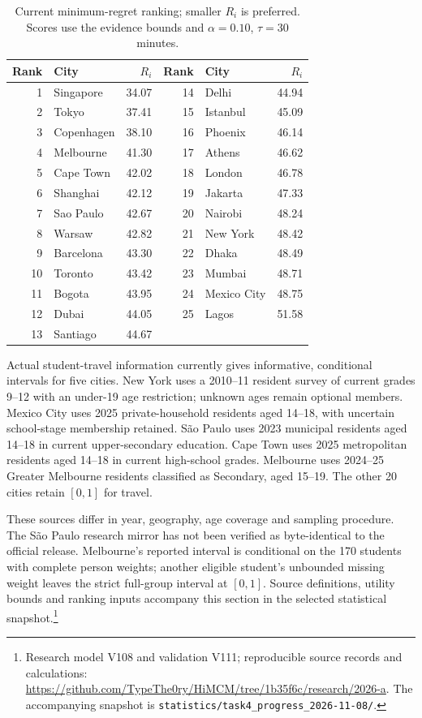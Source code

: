 \begin{table}[htbp]
\centering
\caption{Current minimum-regret ranking; smaller $R_i$ is preferred.
Scores use the evidence bounds and $\alpha=0.10$, $\tau=30$ minutes.}
\label{tab:t4rank}
\begin{tabular}{rlr@{\hspace{1.2em}}rlr}
\toprule
Rank & City & $R_i$ & Rank & City & $R_i$\\
\midrule
1 & Singapore & 34.07 & 14 & Delhi & 44.94 \\
2 & Tokyo & 37.41 & 15 & Istanbul & 45.09 \\
3 & Copenhagen & 38.10 & 16 & Phoenix & 46.14 \\
4 & Melbourne & 41.30 & 17 & Athens & 46.62 \\
5 & Cape Town & 42.02 & 18 & London & 46.78 \\
6 & Shanghai & 42.12 & 19 & Jakarta & 47.33 \\
7 & Sao Paulo & 42.67 & 20 & Nairobi & 48.24 \\
8 & Warsaw & 42.82 & 21 & New York & 48.42 \\
9 & Barcelona & 43.30 & 22 & Dhaka & 48.49 \\
10 & Toronto & 43.42 & 23 & Mumbai & 48.71 \\
11 & Bogota & 43.95 & 24 & Mexico City & 48.75 \\
12 & Dubai & 44.05 & 25 & Lagos & 51.58 \\
13 & Santiago & 44.67 &  & &  \\
\bottomrule
\end{tabular}
\end{table}

Actual student-travel information currently gives informative, conditional
intervals for five cities. New York uses a 2010--11 resident survey of
current grades 9--12 with an under-19 age restriction; unknown ages remain optional members. Mexico City uses
2025 private-household residents aged 14--18, with uncertain school-stage
membership retained. S\~ao Paulo uses 2023 municipal residents aged 14--18
in current upper-secondary education. Cape Town uses 2025 metropolitan
residents aged 14--18 in current high-school grades. Melbourne uses
2024--25 Greater Melbourne residents classified as Secondary, aged 15--19.
The other 20 cities retain $[0,1]$ for travel.

These sources differ in year, geography, age coverage and sampling procedure.
The S\~ao Paulo research mirror has not been verified as byte-identical to
the official release. Melbourne's reported interval is conditional on the
170 students with complete person weights; another eligible student's
unbounded missing weight leaves the strict full-group interval at $[0,1]$.
Source definitions, utility bounds and ranking inputs accompany this section
in the selected statistical snapshot.\footnote{Research model V108 and
validation V111; reproducible source records and calculations:
\url{https://github.com/TypeThe0ry/HiMCM/tree/1b35f6c/research/2026-a}.
The accompanying snapshot is \texttt{statistics/task4\_progress\_2026-11-08/}.}

